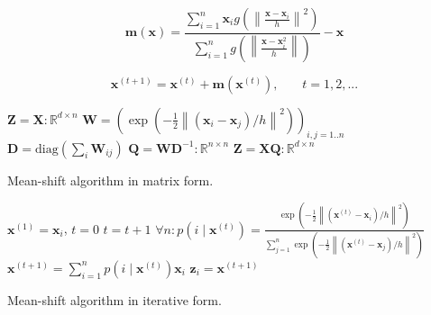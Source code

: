 \documentclass{article}
\newcommand{\norm}[1]{\left\lVert#1\right\rVert}
\begin{document}
\begin{equation}
	\bm{m}(\bm{x}) = \frac{\sum_{i=1}^n \bm{x}_i g(\norm{\frac{\bm{x} - \bm{x}_i}{h}}^2)}{\sum_{i=1}^n g(\norm{\frac{\bm{x} - \bm{x}_i^2}{h}})} - \bm{x}
\end{equation}


\begin{equation}
	\bm{x}^{(t+1)} = \bm{x}^{(t)} + \bm{m}(\bm{x}^{(t)})\text{,}\qquad t = 1, 2, ...
\end{equation}



\begin{algorithm}
	\begin{algorithmic}[1]
		\State $\bm{Z} = \bm{X} : \mathbb{R}^{d\times n}$
		\Repeat
		\State $\bm{W} = (\exp(-\frac{1}{2} \norm{(\bm{x}_i - \bm{x}_j) / h}^2))_{i,j = 1..n}$
		\State $\bm{D} = \text{diag}(\sum_i \bm{W}_{ij})$
		\State $\bm{Q} = \bm{W} \bm{D}^{-1} : \mathbb{R}^{n\times n}$
		\State $\bm{Z} = \bm{X} \bm{Q} : \mathbb{R}^{d\times n}$
		\State \Return {}
		\EndFunction
	\end{algorithmic}
	\caption{Mean-shift algorithm in matrix form.}
	\label{alg:mean-shift-algorithm-matrix-form}
\end{algorithm}

\begin{algorithm}
	\begin{algorithmic}[1]
		\State $\bm{x}^{(1)} = \bm{x}_i$, $t=0$
		\Repeat
		\State $t = t + 1$
		\State $\forall n: p(i \mid \bm{x}^{(t)}) = \frac{\exp(-\frac{1}{2} \norm{(\bm{x}^{(t)} - \bm{x}_i) / h}^2)}{\sum_{j=1}^n \exp(-\frac{1}{2} \norm{(\bm{x}^{(t)} - \bm{x}_j) / h }^2)}$
		\State $\bm{x}^{(t+1)} = \sum_{i=1}^n p(i \mid \bm{x}^{(t)}) \bm{x}_i$
		\Until{$\norm{\bm{x}^{(t+1)} - \bm{x}^{(t)}} < tol$}
		\State $\bm{z}_i = \bm{x}^{(t+1)}$
		\EndFor
		\State \Return {}
		\EndFunction
	\end{algorithmic}
	\caption{Mean-shift algorithm in iterative form.}
	\label{alg:mean-shift-algorithm-iterative-form}
\end{algorithm}
\end{document}
